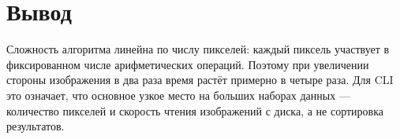\documentclass[12pt,a4paper]{article}
\begin{document}
\section{Вывод}

Сложность алгоритма линейна по числу пикселей: каждый пиксель участвует в
фиксированном числе арифметических операций. Поэтому при увеличении стороны
изображения в два раза время растёт примерно в четыре раза. Для CLI это
означает, что основное узкое место на больших наборах данных --- количество
пикселей и скорость чтения изображений с диска, а не сортировка результатов.
\end{document}
